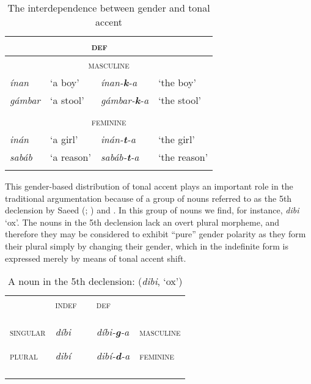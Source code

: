 \documentclass[output=paper]{langsci/langscibook}
\begin{document}
\begin{table}
\caption{The interdependence between gender and tonal accent}
\label{tab:3}

\begin{tabularx}{\textwidth}{XXXX} 
\lsptoprule
 \multicolumn{2}{c}{\textsc{indef}}    & \multicolumn{2}{c}{\textsc{def}}  \\
 \midrule
 
 \multicolumn{4}{c}{\textsc{masculine}}\\
 \textit{ínan} & ‘a boy’      & \textit{ínan-\textbf{k}-a}   &    ‘the boy’\\
 \textit{gámbar}  &  {‘a stool’} & \textit{gámbar-\textbf{k}-a}  &   ‘the stool’\\
\\
 \multicolumn{4}{c}{\textsc{feminine}}\\
 \textit{inán}  &  ‘a girl’    & \textit{inán-\textbf{t}-a}  &  ‘the girl’\\
 \textit{sabáb} &  ‘a reason’  & \textit{sabáb-\textbf{t}-a}  & ‘the reason’\\
  
\lspbottomrule
\end{tabularx}
\end{table} 


This gender-based distribution of tonal accent plays an important role in the traditional argumentation because of a group of nouns referred to as the 5th declension by Saeed (\citeyear*[134]{1993}; \citeyear*[61]{1999}) and \citet[48]{Orwin1995}. In this group of nouns we find, for instance, \textit{dibi} ‘ox’. The nouns in the 5th declension lack an overt plural morpheme, and therefore they may be considered to exhibit “pure” gender polarity as they form their plural simply by changing their gender, which in the indefinite form is expressed merely by means of tonal accent shift.
 
\begin{table}
\caption{A noun in the 5th declension: (\textit{dibi}, `ox')}
\label{tab:4}

\begin{tabularx}{\textwidth}{XXcXX} & {\textsc{indef}} &  & {\textsc{def}} & \\
\lsptoprule
{\textsc{singular}}

{\textsc{plural}} & {\textit{díbi}}

{\textit{dibí}} &  & {\textit{díbi-}\textbf{\textit{g}}\textit{-a}}

{\textit{dibí-}\textbf{\textit{d}}\textit{-a}} & {\textsc{masculine}}

{\textsc{feminine}}\\
\lspbottomrule
\end{tabularx}
\end{table} 
\end{document}
